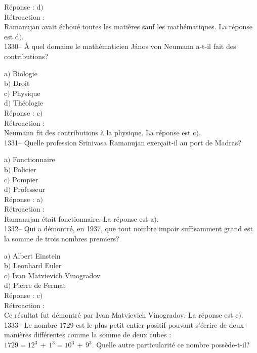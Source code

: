 ﻿\documentclass[letterpaper, 12pt]{article}
\begin{document}
R\'eponse : d$)$\\

R\'etroaction : \\
Ramanujan avait \'echou\'e toutes les mati\`eres sauf les
math\'ematiques.
La r\'eponse est  d$)$.\\

1330-- \`A quel domaine le math\'ematicien J\'anos von Neumann
a-t-il fait des contributions?

a$)$ Biologie \\
b$)$ Droit \\
c$)$ Physique \\
d$)$ Th\'eologie\\

R\'eponse : c$)$\\

R\'etroaction : \\
Neumann fit des contributions \`a la physique.
La r\'eponse est  c$)$.\\


1331-- Quelle profession Srinivasa Ramanujan exer\c cait-il au port
de Madras?

a$)$ Fonctionnaire \\
b$)$ Policier \\
c$)$ Pompier \\
d$)$ Professeur\\

R\'eponse : a$)$\\

R\'etroaction : \\
Ramanujan \'etait fonctionnaire.
La r\'eponse est  a$)$.\\

1332-- Qui a d\'emontr\'e, en 1937, que tout nombre impair
suffisamment grand est la somme de trois nombres premiers?

a$)$ Albert Einstein \\
b$)$ Leonhard Euler \\
c$)$ Ivan Matvievich Vinogradov \\
d$)$ Pierre de Fermat\\

R\'eponse : c$)$\\

R\'etroaction : \\
Ce r\'esultat fut d\'emontr\'e par Ivan Matvievich Vinogradov.
La r\'eponse est  c$)$.\\




1333-- Le nombre 1729 est le plus petit entier positif pouvant
s'\'ecrire de deux mani\`eres diff\'erentes comme la somme de deux
cubes : $1729=12^3\,+\,1^3=10^3\,+\,9^3$. Quelle autre
particularit\'e ce nombre poss\`ede-t-il?
\end{document}
